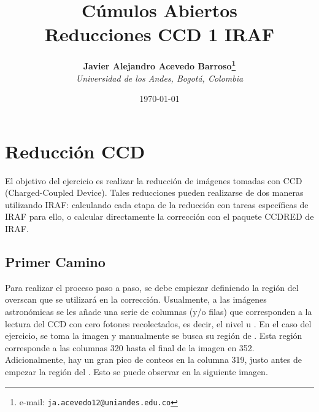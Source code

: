 \documentclass[12pt]{article}
\begin{document}
\title{Cúmulos Abiertos \\ Reducciones CCD 1 IRAF}

\author{
\textbf{Javier Alejandro Acevedo Barroso\thanks{e-mail: \texttt{ja.acevedo12@uniandes.edu.co}}}\\
\textit{Universidad de los Andes, Bogotá, Colombia}\\
 }%

\date{\today}
\maketitle %


\normalsize
\newpage


\section{Reducción CCD}

El objetivo del ejercicio es realizar la reducción de imágenes tomadas con CCD (Charged-Coupled Device). Tales reducciones pueden realizarse de dos maneras utilizando IRAF: calculando cada etapa de la reducción con tareas específicas de IRAF para ello, o calcular directamente la corrección con el paquete CCDRED de IRAF.



\subsection{Primer Camino}
Para realizar el proceso paso a paso, se debe empiezar definiendo la región del overscan que se utilizará en la corrección. Usualmente, a las imágenes astronómicas se les añade una serie de columnas (y/o filas) que corresponden a la lectura del CCD con cero fotones recolectados, es decir, el nivel  u \cite{handbookCCD}. En el caso del ejercicio, se toma la imagen  y manualmente se busca su región de  . Esta región corresponde a las columnas 320 hasta el final de la imagen en 352. Adicionalmente, hay un gran pico de conteos en la columna 319, justo antes de empezar la región del  . Esto se puede observar en la siguiente imagen. \\
\end{document}
